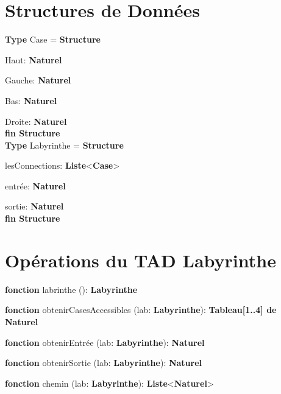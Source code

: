 \documentclass[letterpaper,12pt]{report}
\begin{document}
%
%
\fontsize{14pt}{18pt}
\selectfont

\section*{Structures de Données}
\noindent\textbf{Type} Case = \textbf{Structure}

Haut: \textbf{Naturel}

Gauche: \textbf{Naturel}

Bas: \textbf{Naturel}

Droite: \textbf{Naturel}\\
\textbf{fin Structure}\\

\noindent\textbf{Type} Labyrinthe = \textbf{Structure}

lesConnections: \textbf{Liste}<\textbf{Case}>

entrée: \textbf{Naturel}

sortie: \textbf{Naturel}\\
\textbf{fin Structure}

\section*{Opérations du TAD Labyrinthe}


\textbf{fonction} labrinthe (): \textbf{Labyrinthe}

\textbf{fonction} obtenirCasesAccessibles (lab: \textbf{Labyrinthe}): \textbf{Tableau[1..4] de Naturel}

\textbf{fonction} obtenirEntrée (lab: \textbf{Labyrinthe}): \textbf{Naturel}

\textbf{fonction} obtenirSortie (lab: \textbf{Labyrinthe}): \textbf{Naturel}

\textbf{fonction} chemin (lab: \textbf{Labyrinthe}): \textbf{Liste}<\textbf{Naturel}>
\end{document}
